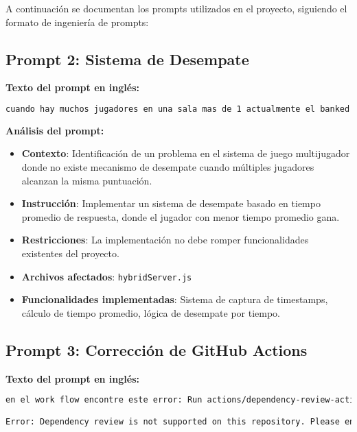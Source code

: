 \documentclass[12pt,a4paper]{article}
\begin{document}
A continuación se documentan los prompts utilizados en el proyecto, siguiendo el formato de ingeniería de prompts:

\subsection{Prompt 2: Sistema de Desempate}

\textbf{Texto del prompt en inglés:}
\begin{lstlisting}[language=bash]
cuando hay muchos jugadores en una sala mas de 1 actualmente el banked no tiene una forma de hacer desempate por lo que te pido que lo realices haslo por tiempo si el promedio de tiempo que se tardo una persona en resolver es menor que del otro pues gana del o contrario no pero haslo sin romper el proyecto
\end{lstlisting}

\textbf{Análisis del prompt:}
\begin{itemize}
    \item \textbf{Contexto}: Identificación de un problema en el sistema de juego multijugador donde no existe mecanismo de desempate cuando múltiples jugadores alcanzan la misma puntuación.
    \item \textbf{Instrucción}: Implementar un sistema de desempate basado en tiempo promedio de respuesta, donde el jugador con menor tiempo promedio gana.
    \item \textbf{Restricciones}: La implementación no debe romper funcionalidades existentes del proyecto.
    \item \textbf{Archivos afectados}: \texttt{hybridServer.js}
    \item \textbf{Funcionalidades implementadas}: Sistema de captura de timestamps, cálculo de tiempo promedio, lógica de desempate por tiempo.
\end{itemize}

\subsection{Prompt 3: Corrección de GitHub Actions}

\textbf{Texto del prompt en inglés:}
\begin{lstlisting}[language=bash]
en el work flow encontre este error: Run actions/dependency-review-action@v4

Error: Dependency review is not supported on this repository. Please ensure that Dependency graph is enabled along with GitHub Advanced Security on private repositories
\end{lstlisting}
\end{document}
